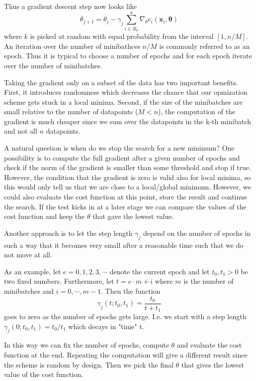 \documentclass[a4paper, twocolumn]{article}
\begin{document}
Thus a gradient descent step now looks like 
\begin{equation} \theta_{j+1} = \theta_j - \gamma_j \sum_{i \in B_k}^n \nabla_\theta c_i(\mathbf{x}_i, \mathbf{\theta}) \end{equation}
where $k$ is picked at random with equal probability from the interval $[1,n/M]$. An iteration over the number of 
minibathces $n/M$ is commonly referred to as an epoch. Thus it is typical to choose a number of epochs and for each epoch 
iterate over the number of minibatches.
 
Taking the gradient only on a subset of the data has two important benefits. First, it introduces randomness 
which decreases the chance that our opmization scheme gets stuck in a local minima. Second, if the size of the 
minibatches are small relative to the number of datapoints ($M < n$), the computation of the gradient is much cheaper 
since we sum over the datapoints in the k-th minibatch and not all $n$ datapoints. 

A natural question is when do we stop the search for a new minimum? One possibility is to compute the full gradient after a 
given number of epochs and check if the norm of the gradient is smaller than some threshold and stop if true. However, 
the condition that the gradient is zero is valid also for local minima, so this would only tell us that we are close to a 
local/global minimum. However, we could also evaluate the cost function at this point, store the result and continue 
the search. If the test kicks in at a later stage we can compare the values of the cost function and keep the $\theta$ that 
gave the lowest value. 

Another approach is to let the step length $\gamma_j$ depend on the number of epochs in such a way that it becomes very small 
after a reasonable time such that we do not move at all. 

As an example, let $e = 0,1,2,3,\cdots$ denote the current epoch and let $t_0, t_1 > 0$ be two fixed numbers. Furthermore, 
let $t = e \cdot m + i$ where $m$ is the number of minibatches and $i=0,\cdots,m-1$. Then the function 
\begin{equation}\gamma_j(t; t_0, t_1) = \frac{t_0}{t+t_1} \end{equation}
goes to zero as the number of epochs gets large. I.e. we start with a step length $\gamma_j (0; t_0, t_1) = t_0/t_1$ which 
decays in "time" t. 

In this way we can fix the number of epochs, compute $\theta$ and evaluate the cost function at the end. Repeating the 
computation will give a different result since the scheme is random by design. Then we pick the final $\theta$ that gives 
the lowest value of the cost function.
\end{document}
